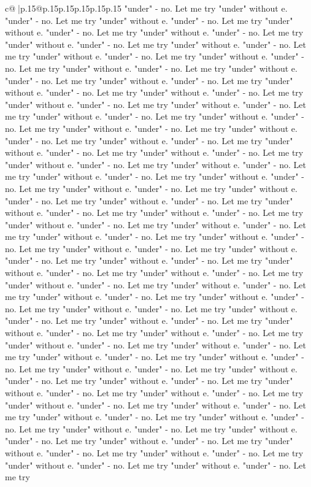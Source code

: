 \documentclass{article}
\begin{document}
{\begin{supertabular}{c@{$\;$}|p{.15\linewidth}@{}p{.15\linewidth}p{.15\linewidth}p{.15\linewidth}p{.15\linewidth}p{.15\linewidth}}
{{{"under" {-} no. Let me try "under" without e. "under" {-} no. Let me try "under" without e. "under" {-} no. Let me try "under" without e. "under" {-} no. Let me try "under" without e. "under" {-} no. Let me try "under" without e. "under" {-} no. Let me try "under" without e. "under" {-} no. Let me try "under" without e. "under" {-} no. Let me try "under" without e. "under" {-} no. Let me try "under" without e. "under" {-} no. Let me try "under" without e. "under" {-} no. Let me try "under" without e. "under" {-} no. Let me try "under" without e. "under" {-} no. Let me try "under" without e. "under" {-} no. Let me try "under" without e. "under" {-} no. Let me try "under" without e. "under" {-} no. Let me try "under" without e. "under" {-} no. Let me try "under" without e. "under" {-} no. Let me try "under" without e. "under" {-} no. Let me try "under" without e. "under" {-} no. Let me try "under" without e. "under" {-} no. Let me try "under" without e. "under" {-} no. Let me try "under" without e. "under" {-} no. Let me try "under" without e. "under" {-} no. Let me try "under" without e. "under" {-} no. Let me try "under" without e. "under" {-} no. Let me try "under" without e. "under" {-} no. Let me try "under" without e. "under" {-} no. Let me try "under" without e. "under" {-} no. Let me try "under" without e. "under" {-} no. Let me try "under" without e. "under" {-} no. Let me try "under" without e. "under" {-} no. Let me try "under" without e. "under" {-} no. Let me try "under" without e. "under" {-} no. Let me try "under" without e. "under" {-} no. Let me try "under" without e. "under" {-} no. Let me try "under" without e. "under" {-} no. Let me try "under" without e. "under" {-} no. Let me try "under" without e. "under" {-} no. Let me try "under" without e. "under" {-} no. Let me try "under" without e. "under" {-} no. Let me try "under" without e. "under" {-} no. Let me try "under" without e. "under" {-} no. Let me try "under" without e. "under" {-} no. Let me try "under" without e. "under" {-} no. Let me try "under" without e. "under" {-} no. Let me try "under" without e. "under" {-} no. Let me try "under" without e. "under" {-} no. Let me try "under" without e. "under" {-} no. Let me try "under" without e. "under" {-} no. Let me try "under" without e. "under" {-} no. Let me try "under" without e. "under" {-} no. Let me try "under" without e. "under" {-} no. Let me try "under" without e. "under" {-} no. Let me try "under" without e. "under" {-} no. Let me try "under" without e. "under" {-} no. Let me try "under" without e. "under" {-} no. Let me try "under" without e. "under" {-} no. Let me try "under" without e. "under" {-} no. Let me try "under" without e. "under" {-} no. Let me try "under" without e. "under" {-} no. Let me try "under" without e. "under" {-} no. Let me try "under" without e. "under" {-} no. Let me try "under" without e. "under" {-} no. Let me try "under" without e. "under" {-} no. Let me try "under" without e. "under" {-} no. Let me try "under" without e. "under" {-} no. Let me try "under" without e. "under" {-} no. Let me try "under" without e. "under" {-} no. Let me try "under" without e. "under" {-} no. Let me try }}}
\end{supertabular}}
\end{document}
